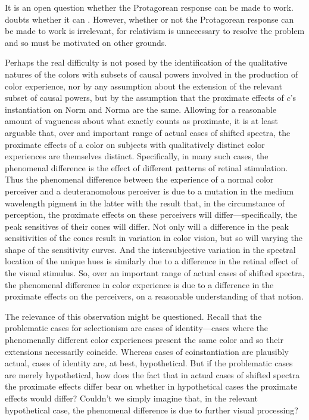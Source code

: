\documentclass[12pt]{article}
\begin{document}
It is an open question whether the Protagorean response can be made to work. \citet{Shoemaker:wk} doubts whether it can \citep[for further doubts about Protagorean relativism, see][]{Kalderon:2006tg}. However, whether or not the Protagorean response can be made to work is irrelevant, for relativism is unnecessary to resolve the problem and so must be motivated on other grounds.

Perhaps the real difficulty is not posed by the identification of the qualitative natures of the colors with subsets of causal powers involved in the production of color experience, nor by any assumption about the extension of the relevant subset of causal powers, but by the assumption that the proximate effects of \( c \)'s instantiation on Norm and Norma are the same. Allowing for a reasonable amount of vagueness about what exactly counts as proximate, it is at least arguable that, over and important range of actual cases of shifted spectra, the proximate effects of a color on subjects with qualitatively distinct color experiences are themselves distinct. Specifically, in many such cases, the phenomenal difference is the effect of different patterns of retinal stimulation. Thus the phenomenal difference between the experience of a normal color perceiver and a deuteranomolous perceiver is due to a mutation in the medium wavelength pigment in the latter with the result that, in the circumstance of perception, the proximate effects on these perceivers will differ---specifically, the peak sensitives of their cones will differ. Not only will a difference in the peak sensitivities of the cones result in variation in color vision, but so will varying the shape of the sensitivity curves. And the intersubjective variation in the spectral location of the unique hues is similarly due to a difference in the retinal effect of the visual stimulus. So, over an important range of actual cases of shifted spectra, the phenomenal difference in color experience is due to a difference in the proximate effects on the perceivers, on a reasonable understanding of that notion.

The relevance of this observation might be questioned. Recall that the problematic cases for selectionism are cases of identity---cases where the phenomenally different color experiences present the same color and so their extensions necessarily coincide. Whereas cases of coinstantiation are plausibly actual, cases of identity are, at best, hypothetical. But if the problematic cases are merely hypothetical, how does the fact that in actual cases of shifted spectra the proximate effects differ bear on whether in hypothetical cases the proximate effects would differ? Couldn't we simply imagine that, in the relevant hypothetical case, the phenomenal difference is due to further visual processing?
\end{document}
